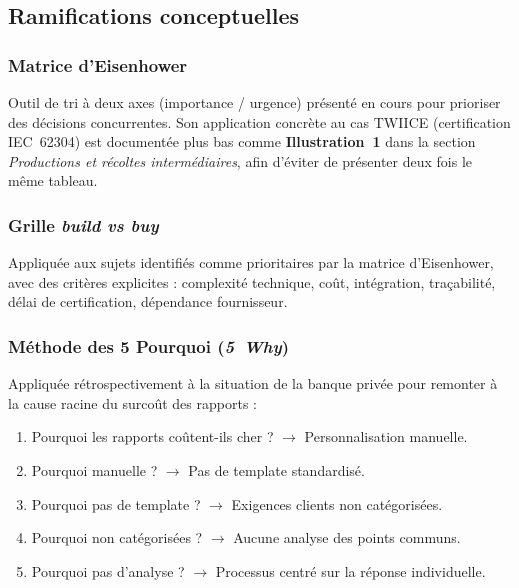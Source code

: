 \subsection{Ramifications conceptuelles}

\subsubsection*{Matrice d'Eisenhower}

Outil de tri à deux axes (importance / urgence) présenté en cours pour prioriser des décisions concurrentes. Son application concrète au cas TWIICE (certification IEC~62304) est documentée plus bas comme \textbf{Illustration~1} dans la section \textit{Productions et récoltes intermédiaires}, afin d'éviter de présenter deux fois le même tableau.

\subsubsection*{Grille \textit{build vs buy}}

Appliquée aux sujets identifiés comme prioritaires par la matrice d'Eisenhower, avec des critères explicites : complexité technique, coût, intégration, traçabilité, délai de certification, dépendance fournisseur.

\subsubsection*{Méthode des 5 Pourquoi (\textit{5~Why})}

Appliquée rétrospectivement à la situation de la banque privée pour remonter à la cause racine du surcoût des rapports :

\begin{enumerate}
  \item Pourquoi les rapports coûtent-ils cher ? $\rightarrow$ Personnalisation manuelle.
  \item Pourquoi manuelle ? $\rightarrow$ Pas de template standardisé.
  \item Pourquoi pas de template ? $\rightarrow$ Exigences clients non catégorisées.
  \item Pourquoi non catégorisées ? $\rightarrow$ Aucune analyse des points communs.
  \item Pourquoi pas d'analyse ? $\rightarrow$ Processus centré sur la réponse individuelle.
\end{enumerate}

